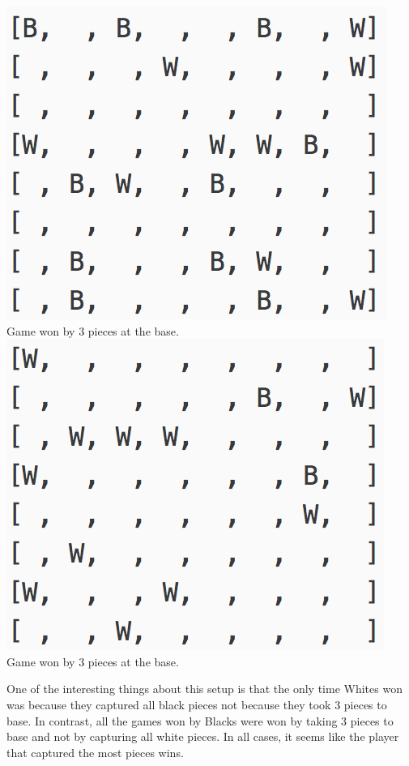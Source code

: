 \documentclass[11pt]{article}
\begin{document}
\begin{center}
\includegraphics[scale=1]{part2/ab-o1-vs-ab-d1-3workers-black.png}\\
Game won by 3 pieces at the base.\\

\includegraphics[scale=1]{part2/ab-o1-vs-ab-d1-3workers-whites.png}\\
Game won by 3 pieces at the base.\\
\end{center}
One of the interesting things about this setup is that the only time Whites won was because they captured all black pieces not because they took 3 pieces to base. In contrast, all the games won by Blacks were won by taking 3 pieces to base and not by capturing all white pieces. In all cases, it seems like the player that captured the most pieces wins.\\
\end{document}
